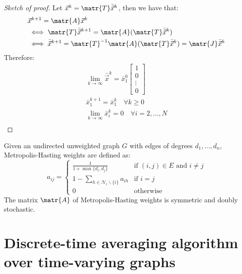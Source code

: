 \begin{theorem}
\begin{proof}[Sketch of proof]
        Let $\vec{x}^k = \matr{T}\bar{\vec{x}}^k$, then we have that:
        \[
            \begin{split}
                &\vec{x}^{k+1} = \matr{A} \vec{x}^{k} \\
                &\iff \matr{T} \bar{\vec{x}}^{k+1} = \matr{A} (\matr{T} \bar{\vec{x}}^k) \\
                &\iff \bar{\vec{x}}^{k+1} = \matr{T}^{-1} \matr{A} (\matr{T} \bar{\vec{x}}^k) = \matr{J}\bar{\vec{x}}^k 
            \end{split}
        \]
        Therefore:
        \[
            \begin{gathered}
                \lim_{k \rightarrow \infty} \bar{\vec{x}}^k = \bar{x}_1^0 \begin{bmatrix} 1 \\ 0 \\ \vdots \\ 0 \end{bmatrix} \\
                \bar{x}_1^{k+1} = \bar{x}_1^k \quad \forall k \geq 0 \\
                \lim_{k \rightarrow \infty} \bar{x}_i^{k} = 0 \quad \forall i = 2, \dots, N \\
            \end{gathered}
        \]
    \end{proof}
\end{theorem}

\begin{example}
    Given an undirected unweighted graph $G$ with edges of degrees $d_1, \dots, d_n$, Metropolis-Hasting weights are defined as:
    \[
        a_{ij} = \begin{cases}
            \frac{1}{1+\max\{ d_i, d_j \}} & \text{if $(i, j) \in E$ and $i \neq j$} \\
            1 - \sum_{h \in \mathcal{N}_i \smallsetminus \{i\}} a_{ih} & \text{if $i=j$} \\
            0 & \text{otherwise}
        \end{cases}
    \]
    The matrix $\matr{A}$ of Metropolis-Hasting weights is symmetric and doubly stochastic.
\end{example}



\section{Discrete-time averaging algorithm over time-varying graphs}


